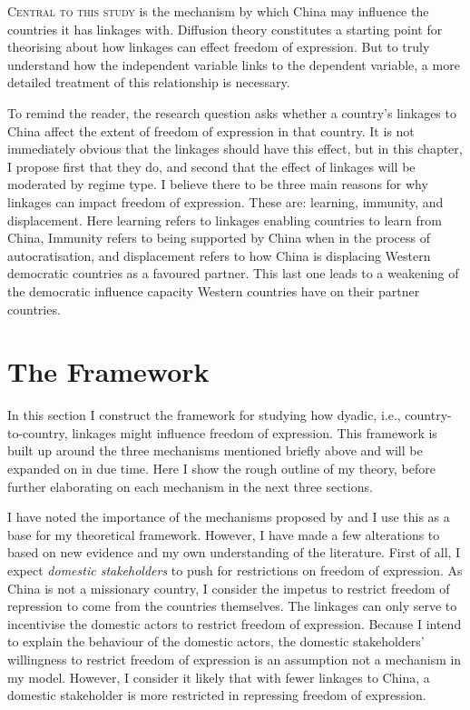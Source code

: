 \lettrine{C}{entral to this study} is the mechanism by which China may influence the countries it has linkages with. Diffusion theory constitutes a starting point for theorising about how linkages can effect freedom of expression. But to truly understand how the independent variable links to the dependent variable, a more detailed treatment of this relationship is necessary.

To remind the reader, the research question asks whether a country's linkages to China affect the extent of freedom of expression in that country. It is not immediately obvious that the linkages should have this effect, but in this chapter, I propose first that they do, and second that the effect of linkages will be moderated by regime type. I believe there to be three main reasons for why linkages can impact freedom of expression. These are: learning, immunity, and displacement. Here learning refers to linkages enabling countries to learn from China, Immunity refers to being supported by China when in the process of autocratisation, and displacement refers to how China is displacing Western democratic countries as a favoured partner. This last one leads to a weakening of the democratic influence capacity Western countries have on their partner countries.

\section{The Framework}
In this section I construct the framework for studying how dyadic, i.e., country-to-country, linkages might influence freedom of expression. This framework is built up around the three mechanisms mentioned briefly above and will be expanded on in due time. Here I show the rough outline of my theory, before further elaborating on each mechanism in the next three sections. 

I have noted the importance of the mechanisms proposed by \citet{tansey_ties_2017} and I use this as a base for my theoretical framework. However, I have made a few alterations to based on new evidence \citep{weyland_autocratic_2017} and my own understanding of the literature. First of all, I expect \textit{domestic stakeholders} to push for restrictions on freedom of expression. As China is not a missionary country, I consider the impetus to restrict freedom of repression to come from the countries themselves. The linkages can only serve to incentivise the domestic actors to restrict freedom of expression. Because I intend to explain the behaviour of the domestic actors, the domestic stakeholders' willingness to restrict freedom of expression is an assumption not a mechanism in my model. However, I consider it likely that with fewer linkages to China, a domestic stakeholder is more restricted in repressing freedom of expression.

